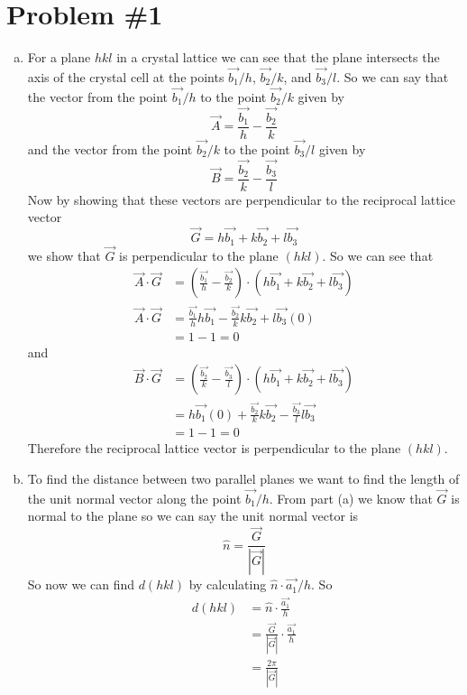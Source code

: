 \documentclass[11pt]{article}
\numberwithin{equation}{section}
\begin{document}


\section{Problem \#1}
\begin{enumerate}[(a)]
\item
For a plane $hkl$ in a crystal lattice we can see that the plane intersects the axis of the crystal cell at the points $\vec{b_1}/h$, $\vec{b_2}/k$, and $\vec{b_3}/l$. So we can say that the vector from the point $\vec{b_1}/h$ to the point $\vec{b_2}/k$ given by 
$$\vec{A} = \frac{\vec{b_1}}{h} - \frac{\vec{b_2}}{k}$$
and the vector from the point $\vec{b_2}/k$ to the point $\vec{b_3}/l$ given by 
$$\vec{B} = \frac{\vec{b_2}}{k} - \frac{\vec{b_3}}{l}$$
Now by showing that these vectors are perpendicular to the reciprocal lattice vector 
$$\vec{G} = h\vec{b_1}+k\vec{b_2}+l\vec{b_3}$$
we show that $\vec{G}$ is perpendicular to the plane $(hkl)$. So we can see that
\begin{align*}
\vec{A}\cdot\vec{G} &= \left(\frac{\vec{b_1}}{h} - \frac{\vec{b_2}}{k}\right)\cdot \left(h\vec{b_1}+k\vec{b_2}+l\vec{b_3}\right)\\
\vec{A}\cdot\vec{G} &= \frac{\vec{b_1}}{h}h\vec{b_1} - \frac{\vec{b_2}}{k}k\vec{b_2}+l\vec{b_3}(0)\\
&= 1 - 1 = 0
\end{align*}
and
\begin{align*}
\vec{B}\cdot\vec{G} &= \left(\frac{\vec{b_2}}{k} - \frac{\vec{b_3}}{l}\right)\cdot \left(h\vec{b_1}+k\vec{b_2}+l\vec{b_3}\right)\\
&= h\vec{b_1}(0) + \frac{\vec{b_2}}{k}k\vec{b_2} - \frac{\vec{b_3}}{l}l\vec{b_3}\\
&= 1 - 1 = 0
\end{align*}
Therefore the reciprocal lattice vector is perpendicular to the plane $(hkl)$.

\item
To find the distance between two parallel planes we want to find the length of the unit normal vector along the point $\vec{b_1}/h$. From part (a) we know that $\vec{G}$ is normal to the plane so we can say the unit normal vector is
$$\hat{n} = \frac{\vec{G}}{|\vec{G}|}$$
So now we can find $d(hkl)$ by calculating $\hat{n}\cdot\vec{a_1}/h$. So
\begin{align*}
d(hkl) &= \hat{n}\cdot\frac{\vec{a_1}}{h}\\
&= \frac{\vec{G}}{|\vec{G}|}\cdot\frac{\vec{a_1}}{h}\\
&= \frac{2\pi}{|\vec{G}|}
\end{align*}


\end{enumerate}
\end{document}
